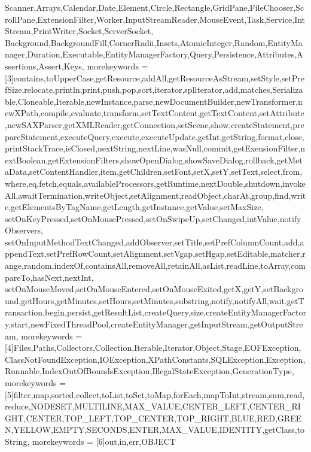 {{    Scanner,Arrays,Calendar,Date,Element,Circle,Rectangle,GridPane,FileChooser,ScrollPane,ExtensionFilter,Worker,InputStreamReader,MouseEvent,Task,Service,IntStream,PrintWriter,Socket,ServerSocket,%
    Background,BackgroundFill,CornerRadii,Insets,AtomicInteger,Random,EntityManager,Duration,Executable,EntityManagerFactory,Query,Persistence,Attributes,Assertions,Assert,Keys},
    morekeywords = [3]{contains,toUpperCase,getResource,addAll,getResourceAsStream,setStyle,setPrefSize,relocate,println,print,push,pop,sort,iterator,spliterator,add,matches,Serializable,Cloneable,Iterable,newInstance,parse,newDocumentBuilder,newTransformer,newXPath,compile,evaluate,transform,setTextContent,getTextContent,setAttribute,newSAXParser,getXMLReader,getConnection,setScene,show,createStatement,prepareStatement,executeQuery,execute,executeUpdate,getInt,getString,format,close,printStackTrace,isClosed,nextString,nextLine,wasNull,commit,getExensionFilter,nextBoolean,getExtensionFilters,showOpenDialog,showSaveDialog,rollback,getMetaData,setContentHandler,item,getChildren,setFont,setX,setY,setText,select,from,where,eq,fetch,equals,availableProcessors,getRuntime,nextDouble,shutdown,invokeAll,awaitTermination,writeObject,setAlignment,readObject,charAt,group,find,write,getElementsByTagName,getLength,getInstance,getValue,setMaxSize,%
    setOnKeyPressed,setOnMousePressed,setOnSwipeUp,setChanged,intValue,notifyObservers, setOnInputMethodTextChanged,addObserver,setTitle,setPrefColumnCount,add,appendText,setPrefRowCount,setAlignment,setVgap,setHgap,setEditable,matcher,range,random,indexOf,containsAll,removeAll,retainAll,asList,readLine,toArray,compareTo,hasNext,nextInt,%
    setOnMouseMoved,setOnMouseEntered,setOnMouseExited,getX,getY,setBackground,getHours,getMinutes,setHours,setMinutes,substring,notify,notifyAll,wait,getTransaction,begin,persist,getResultList,createQuery,size,createEntityManagerFactory,start,newFixedThreadPool,createEntityManager,getInputStream,getOutputStream},
    morekeywords = [4]{Files,Paths,Collectors,Collection,Iterable,Iterator,Object,Stage,EOFException,ClassNotFoundException,IOException,XPathConstants,SQLException,Exception,Runnable,IndexOutOfBoundsException,IllegalStateException,GenerationType},
    morekeywords = [5]{filter,map,sorted,collect,toList,toSet,toMap,forEach,mapToInt,stream,sum,read,reduce,NODESET,MULTILINE,MAX_VALUE,CENTER_LEFT,CENTER_RIGHT,CENTER,TOP_LEFT,TOP_CENTER,TOP_RIGHT,BLUE,RED,GREEN,YELLOW,EMPTY,SECONDS,ENTER,MAX_VALUE,IDENTITY,getClass,toString},
    morekeywords = [6]{out,in,err,OBJECT}}
